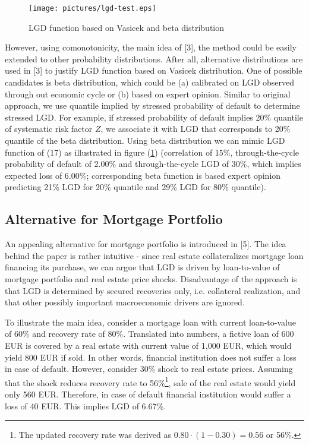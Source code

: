 \documentclass[a4paper]{article}
\begin{document}
\begin{center}
\begin{figure}[htp]
\texttt{[image: pictures/lgd-test.eps]}
\caption{LGD function based on Vasicek and beta distribution}
\label{lgd-test}
\end{figure}
\end{center}

However, using comonotonicity, the main idea of [3], the method could be easily extended to other probability distributions.
After all, alternative distributions are used in [3] to justify
LGD function based on Vasicek distribution. One of possible candidates is beta distribution, which could be (a) calibrated on LGD
observed through out economic cycle or (b) based on expert opinion. Similar to original approach, we use quantile implied by stressed
probability of default to determine stressed LGD. For example, if stressed probability
of default implies 20\% quantile of systematic risk factor $Z$, we associate it with LGD that corresponds to 20\% quantile of the
beta distribution. Using beta distribution we can mimic LGD function of (17) as
illustrated in figure (\ref{lgd-test}) (correlation of 15\%, through-the-cycle probability of default of 2.00\% and through-the-cycle
LGD of 30\%, which implies expected loss of 6.00\%; corresponding beta function is based
expert opinion predicting 21\% LGD for 20\% quantile and 29\% LGD for 80\% quantile).

\subsection{Alternative for Mortgage Portfolio}

An appealing alternative for mortgage portfolio is introduced in [5]. The idea behind the paper is rather intuitive - since real estate collateralizes
mortgage loan financing its purchase, we can argue that LGD is driven by loan-to-value of mortgage portfolio and real estate price shocks. Disadvantage of the approach
is that LGD is determined by secured recoveries only, i.e. collateral realization, and that other possibly important macroeconomic drivers are ignored.

To illustrate the main idea, consider a mortgage loan with
current loan-to-value of 60\% and recovery rate of 80\%. Translated into numbers, a fictive loan of 600 EUR is covered by a real estate with current value of 1,000 EUR,
which would yield 800 EUR if sold. In other words, financial institution does not suffer a loss in case of default.
However, consider 30\% shock to real estate prices. Assuming that the shock reduces recovery rate to 56\%\footnote{The updated recovery rate was derived as $0.80 \cdot (1 - 0.30) = 0.56$ or 56\%.}, sale of the real estate would yield only 560 EUR.
Therefore, in case of default financial institution would suffer a loss of 40 EUR. This implies LGD of 6.67\%.
\end{document}
